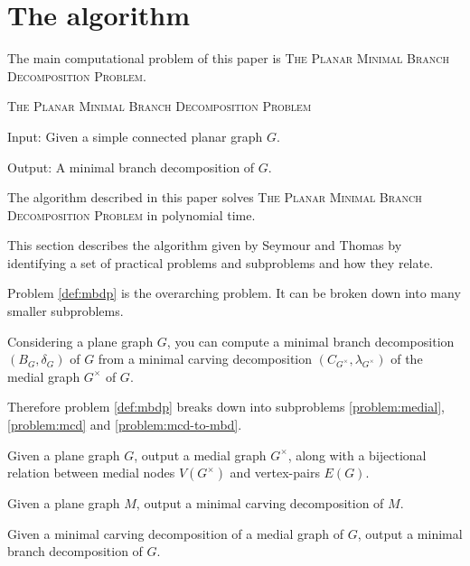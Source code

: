 \documentclass{article}
\begin{document}

\section{The algorithm}

	The main computational problem of this paper is \textsc{The Planar Minimal Branch Decomposition Problem}.

	\begin{definition}\label{def:mbdp}
		\textsc{The Planar Minimal Branch Decomposition Problem}

		Input: Given a simple connected planar graph $G$.

		Output: A minimal branch decomposition of $G$.
	\end{definition}

	The algorithm described in this paper solves \textsc{The Planar Minimal Branch Decomposition Problem} in polynomial time.

	This section describes the algorithm given by Seymour and Thomas\cite{ST93} by identifying a set of practical problems and subproblems and how they relate.
	
	Problem \ref{def:mbdp} is the overarching problem. It can be broken down into many smaller subproblems.

	Considering a plane graph $G$, you can compute a minimal branch decomposition $(B_G, \delta_G)$ of $G$ from a minimal carving decomposition $(C_{G^\times}, \lambda_{G^\times})$ of the medial graph $G^\times$ of $G$.

	Therefore problem \ref{def:mbdp} breaks down into subproblems \ref{problem:medial}, \ref{problem:mcd} and \ref{problem:mcd-to-mbd}.

	\begin{problem}\label{problem:medial}
		Given a plane graph $G$, output a medial graph $G^\times$, along with a bijectional relation between medial nodes $V(G^\times)$ and vertex-pairs $E(G)$.
	\end{problem}

	\begin{problem}\label{problem:mcd}
		Given a plane graph $M$, output a minimal carving decomposition of $M$.
	\end{problem}

	\begin{problem}\label{problem:mcd-to-mbd}
		Given a minimal carving decomposition of a medial graph of $G$, output a minimal branch decomposition of $G$.
	\end{problem}
\end{document}
